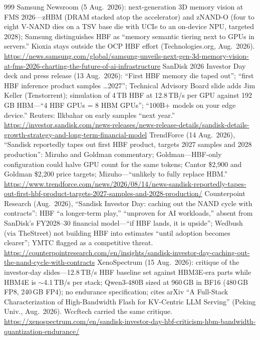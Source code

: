 \begin{thebibliography}{999}
 Samsung Newsroom (5 Aug.\ 2026): next-generation 3D memory vision at FMS 2026---zHBM (DRAM stacked atop the accelerator) and zNAND-O (four to eight V-NAND dies on a TSV base die with UCIe to an on-device NPU, targeted 2028); Samsung distinguishes HBF as ``memory semantic tiering next to GPUs in servers.'' Kioxia stays outside the OCP HBF effort (Technologies.org, Aug.\ 2026). \url{https://news.samsung.com/global/samsung-unveils-next-gen-3d-memory-vision-at-fms-2026-charting-the-future-of-ai-infrastructure}
 SanDisk 2026 Investor Day deck and press release (13 Aug.\ 2026): ``First HBF memory die taped out''; ``first HBF inference product samples \ldots 2027''; Technical Advisory Board slide adds Jim Keller (Tenstorrent); simulation of 4\,TB HBF at 12.8\,TB/s per GPU against 192\,GB HBM---``4 HBF GPUs = 8 HBM GPUs''; ``100B+ models on your edge device.'' Reuters: Ilkbahar on early samples ``next year.'' \url{https://investor.sandisk.com/news-releases/news-release-details/sandisk-details-growth-strategy-and-long-term-financial-model}
 TrendForce (14 Aug.\ 2026), ``Sandisk reportedly tapes out first HBF product, targets 2027 samples and 2028 production'': Mizuho and Goldman commentary; Goldman---HBF-only configuration could halve GPU count for the same tokens; Cantor \$2,900 and Goldman \$2,200 price targets; Mizuho---``unlikely to fully replace HBM.'' \url{https://www.trendforce.com/news/2026/08/14/news-sandisk-reportedly-tapes-out-first-hbf-product-targets-2027-samples-and-2028-production/}
 Counterpoint Research (Aug.\ 2026), ``Sandisk Investor Day: caching out the NAND cycle with contracts'': HBF ``a longer-term play,'' ``unproven for AI workloads,'' absent from SanDisk's FY2028--30 financial model---``if HBF lands, it is upside''; Wedbush (via TheStreet) not building HBF into estimates ``until adoption becomes clearer''; YMTC flagged as a competitive threat. \url{https://counterpointresearch.com/en/insights/sandisk-investor-day-caching-out-the-nand-cycle-with-contracts}
 XenoSpectrum (15 Aug.\ 2026): critique of the investor-day slides---12.8\,TB/s HBF baseline set against HBM3E-era parts while HBM4E is $\sim$4.1\,TB/s per stack; Qwen3-480B sized at 960\,GB in BF16 (480\,GB FP8, 240\,GB FP4); no endurance specification; cites arXiv ``A Full-Stack Characterization of High-Bandwidth Flash for KV-Centric LLM Serving'' (Peking Univ., Aug.\ 2026). Wccftech carried the same critique. \url{https://xenospectrum.com/en/sandisk-investor-day-hbf-criticism-hbm-bandwidth-quantization-endurance/}

\end{thebibliography}
